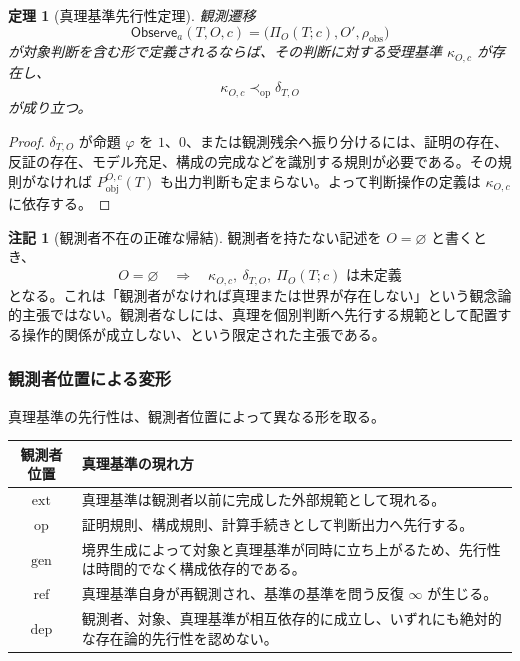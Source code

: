 \documentclass[a4paper,11pt]{ltjsarticle}
\theoremstyle{definition}
\newtheorem{remark}[definition]{注記}
\theoremstyle{plain}
\newtheorem{theorem}[definition]{定理}
\newcommand{\Phase}{\Pi}
\newcommand{\Pobj}{P_{\mathrm{obj}}}
\newcommand{\Observe}{\mathsf{Observe}}
\newcommand{\Residual}{\rho_{\mathrm{obs}}}
\newcommand{\TruthCriterion}{\kappa}
\begin{document}
\begin{theorem}[真理基準先行性定理]
観測遷移
\[
 \Observe_a(T,O,c)
 =
 \bigl(\Phase_O(T;c),O',\Residual\bigr)
\]
が対象判断を含む形で定義されるならば、その判断に対する受理基準 $\TruthCriterion_{O,c}$ が存在し、
\[
 \TruthCriterion_{O,c}
 \prec_{\mathrm{op}}
 \delta_{T,O}
\]
が成り立つ。
\end{theorem}

\begin{proof}
$\delta_{T,O}$ が命題 $\varphi$ を $1$、$0$、または観測残余へ振り分けるには、証明の存在、反証の存在、モデル充足、構成の完成などを識別する規則が必要である。その規則がなければ $\Pobj^{O,c}(T)$ も出力判断も定まらない。よって判断操作の定義は $\TruthCriterion_{O,c}$ に依存する。
\end{proof}

\begin{remark}[観測者不在の正確な帰結]
観測者を持たない記述を $O=\varnothing$ と書くとき、
\[
 O=\varnothing
 \quad\Longrightarrow\quad
 \TruthCriterion_{O,c},\ 
 \delta_{T,O},\ 
 \Phase_O(T;c)
 \text{ は未定義}
\]
となる。これは「観測者がなければ真理または世界が存在しない」という観念論的主張ではない。観測者なしには、真理を個別判断へ先行する規範として配置する操作的関係が成立しない、という限定された主張である。
\end{remark}

\subsubsection{観測者位置による変形}

真理基準の先行性は、観測者位置によって異なる形を取る。
\begin{center}
\begin{tabular}{c p{}}
\toprule
観測者位置 & 真理基準の現れ方 \\
\midrule
$\mathrm{ext}$ & 真理基準は観測者以前に完成した外部規範として現れる。 \\
$\mathrm{op}$ & 証明規則、構成規則、計算手続きとして判断出力へ先行する。 \\
$\mathrm{gen}$ & 境界生成によって対象と真理基準が同時に立ち上がるため、先行性は時間的でなく構成依存的である。 \\
$\mathrm{ref}$ & 真理基準自身が再観測され、基準の基準を問う反復 $\infty$ が生じる。 \\
$\mathrm{dep}$ & 観測者、対象、真理基準が相互依存的に成立し、いずれにも絶対的な存在論的先行性を認めない。 \\
\bottomrule
\end{tabular}
\end{center}
\end{document}
